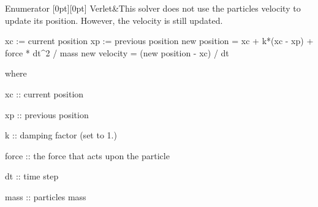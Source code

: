 \begin{DoxyEnumFields}{Enumerator}
[0pt][0pt]{}\mbox{\label{namespacephysim_a09adeda29c09e651877e880d31fc9686ac1f9df543f33d8a79fb2437c853f09b9}} 
Verlet&This solver does not use the particle\textquotesingle{}s velocity to update its position. However, the velocity is still updated. \begin{DoxyVerb}xc := current position
xp := previous position
new position = xc + k*(xc - xp) + force * dt^2 / mass
new velocity = (new position - xc) / dt
\end{DoxyVerb}
 where
\begin{DoxyItemize}
\item xc \+:\+: current position
\item xp \+:\+: previous position
\item k \+:\+: damping factor (set to 1.)
\item force \+:\+: the force that acts upon the particle
\item dt \+:\+: time step
\item mass \+:\+: particle\textquotesingle{}s mass 
\end{DoxyItemize}\\
\hline

\end{DoxyEnumFields}
